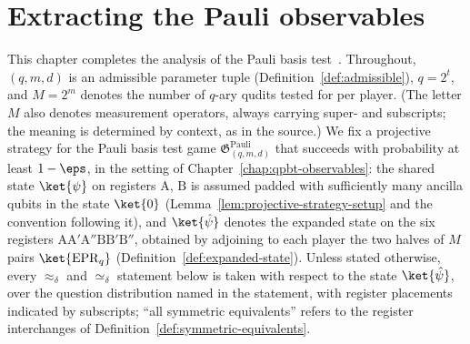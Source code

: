 \chapter{Extracting the Pauli observables}
\label{chap:qpbt-extraction}
\label{sec:separating}

This chapter completes the analysis of the Pauli basis test~\cite{Ji2020MIPStar}. Throughout, $(q,m,d)$ is an admissible parameter tuple (Definition~\ref{def:admissible}), $q = 2^t$, and $M = 2^m$ denotes the number of $q$-ary qudits tested for per player. (The letter $M$ also denotes measurement operators, always carrying super- and subscripts; the meaning is determined by context, as in the source.) We fix a projective strategy for the Pauli basis test game $\mathfrak{G}^{\mathrm{Pauli}}_{(q,m,d)}$ that succeeds with probability at least $1-\eps$, in the setting of Chapter~\ref{chap:qpbt-observables}: the shared state $\ket{\psi}$ on registers $\mathrm{A}$, $\mathrm{B}$ is assumed padded with sufficiently many ancilla qubits in the state $\ket{0}$ (Lemma~\ref{lem:projective-strategy-setup} and the convention following it), and $\ket{\hat\psi}$ denotes the expanded state on the six registers $\mathrm{A}\mathrm{A}'\mathrm{A}''\mathrm{B}\mathrm{B}'\mathrm{B}''$, obtained by adjoining to each player the two halves of $M$ pairs $\ket{\mathrm{EPR}_q}$ (Definition~\ref{def:expanded-state}). Unless stated otherwise, every $\approx_\delta$ and $\simeq_\delta$ statement below is taken with respect to the state $\ket{\hat\psi}$, over the question distribution named in the statement, with register placements indicated by subscripts; ``all symmetric equivalents'' refers to the register interchanges of Definition~\ref{def:symmetric-equivalents}.

